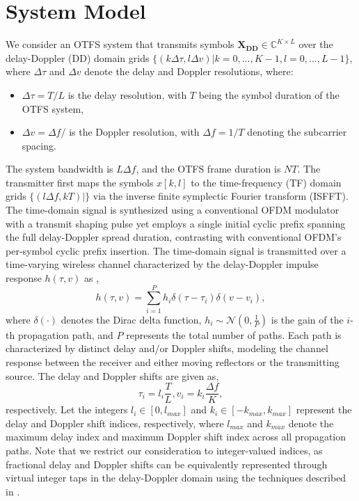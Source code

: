 \documentclass{article}
\begin{document}
\section{System Model}
We consider an OTFS system that transmits symbols $\bm{X_{DD}}\in \mathbb{C}^{K\times L}$ over the delay-Doppler (DD) domain grids $\{(k\Delta\tau, l\Delta v)|k=0,...,K-1, l=0,...,L-1\}$, where $\Delta\tau$ and $\Delta v$ denote the delay and Doppler resolutions, where:
\begin{itemize}[label={--}] %
    \item $\Delta\tau=T/L$ is the delay resolution, with $T$ being the symbol duration of the OTFS system,
    \item $\Delta v=\Delta f/$ is the Doppler resolution, with $\Delta f=1/T$ denoting the subcarrier spacing.
\end{itemize}

The system bandwidth is $L\Delta f$, and the OTFS frame duration is $NT$. The transmitter first maps the symbols $x[k,l]$ to the time-frequency (TF) domain grids $\{(l\Delta f, kT)|\}$ via the inverse finite symplectic Fourier transform (ISFFT). The time-domain signal is synthesized using a conventional OFDM modulator with a transmit shaping pulse yet employs a single initial cyclic prefix spanning the full delay-Doppler spread duration, contrasting with conventional OFDM's per-symbol cyclic prefix insertion. The time-domain signal is transmitted over a time-varying wireless channel characterized by the delay-Doppler impulse response $h(\tau, v)$ as \cite{7925924},
\begin{equation}
h(\tau, v) = \sum_{i=1}^P h_i \delta (\tau - {\tau}_i) \delta (v - v_i) ,
\end{equation}
where $\delta(\cdot)$ denotes the Dirac delta function, $h_i \sim \mathcal{N}(0, \frac{1}{P})$ is the gain of the $i$-th propagation path, and $P$ represents the total number of paths. Each path is characterized by distinct delay and/or Doppler shifts, modeling the channel response between the receiver and either moving reflectors or the transmitting source. The delay and Doppler shifts are given as,
\begin{equation}
{\tau}_i = l_i \frac{T}{L}, v_i = k_i \frac{\Delta f}{K},
\end{equation}
respectively. Let the integers $l_i \in [0, l_{max}]$ and $k_i \in [-k_{max}, k_{max}]$ represent the delay and Doppler shift indices, respectively, where $l_{max}$ and $k_{max}$ denote the maximum delay index and maximum Doppler shift index across all propagation paths. Note that we restrict our consideration to integer-valued indices, as fractional delay and Doppler shifts can be equivalently represented through virtual integer taps in the delay-Doppler domain using the techniques described in \cite{6563167, 8377159, 8516353}.
\end{document}

